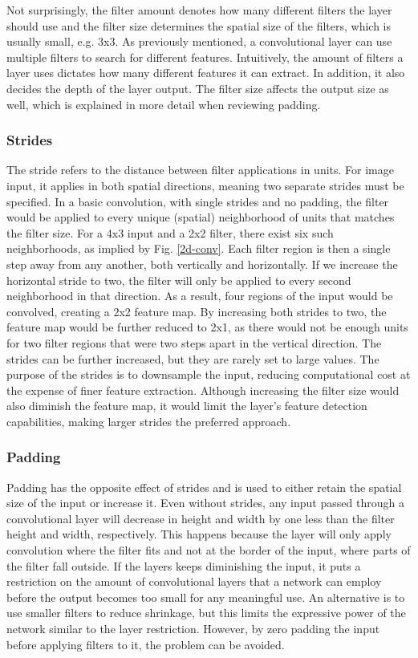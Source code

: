 Not surprisingly, the filter amount denotes how many different filters the layer should use and the filter size determines the spatial size of the filters, which is usually small, e.g. 3x3. As previously mentioned, a convolutional layer can use multiple filters to search for different features. Intuitively, the amount of filters a layer uses dictates how many different features it can extract. In addition, it also decides the depth of the layer output. The filter size affects the output size as well, which is explained in more detail when reviewing padding.

\subsubsection{Strides}

The stride refers to the distance between filter applications in units. For image input, it applies in both spatial directions, meaning two separate strides must be specified. In a basic convolution, with single strides and no padding, the filter would be applied to every unique (spatial) neighborhood of units that matches the filter size. For a 4x3 input and a 2x2 filter, there exist six such neighborhoods, as implied by Fig. \ref{2d-conv}. Each filter region is then a single step away from any another, both vertically and horizontally. If we increase the horizontal stride to two, the filter will only be applied to every second neighborhood in that direction. As a result, four regions of the input would be convolved, creating a 2x2 feature map. By increasing both strides to two, the feature map would be further reduced to 2x1, as there would not be enough units for two filter regions that were two steps apart in the vertical direction. The strides can be further increased, but they are rarely set to large values. The purpose of the strides is to downsample the input, reducing computational cost at the expense of finer feature extraction. Although increasing the filter size would also diminish the feature map, it would limit the layer's feature detection capabilities, making larger strides the preferred approach.

\subsubsection{Padding}

Padding has the opposite effect of strides and is used to either retain the spatial size of the input or increase it. Even without strides, any input passed through a convolutional layer will decrease in height and width by one less than the filter height and width, respectively. This happens because the layer will only apply convolution where the filter fits and not at the border of the input, where parts of the filter fall outside. If the layers keeps diminishing the input, it puts a restriction on the amount of convolutional layers that a network can employ before the output becomes too small for any meaningful use. An alternative is to use smaller filters to reduce shrinkage, but this limits the expressive power of the network similar to the layer restriction. However, by zero padding the input before applying filters to it, the problem can be avoided. \\

